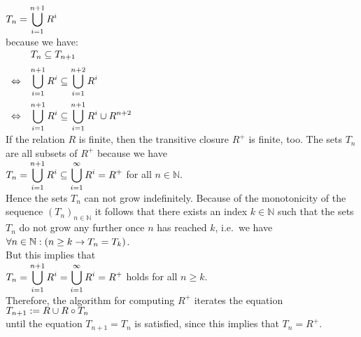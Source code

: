 \\[0.2cm]
\hspace*{1.3cm}
$\displaystyle T_n = \bigcup\limits_{i=1}^{n+1} R^i$ 
\\[0.2cm]
because we have:
\\[0.2cm]
\hspace*{1.3cm}
$
\begin{array}[t]{llcl}
                & \displaystyle T_n \subseteq T_{n+1} \\[0.2cm]
\Leftrightarrow & \displaystyle \bigcup\limits_{i=1}^{n+1} R^i \subseteq \bigcup\limits_{i=1}^{n+2} R^i \\[0.5cm]
\Leftrightarrow & \displaystyle \bigcup\limits_{i=1}^{n+1} R^i \subseteq \bigcup\limits_{i=1}^{n+1} R^i \cup R^{n+2} \\
\end{array}
$
\\[0.2cm]
If the relation  $R$ is finite, then the transitive closure $R^+$ is finite, too.  The sets $T_n$ 
are all subsets of $R^+$ because we have
\\[0.2cm]
\hspace*{1.3cm}
$\displaystyle T_n = \bigcup\limits_{i=1}^{n+1} R^i \subseteq \bigcup\limits_{i=1}^{\infty} R^i = R^+$ \quad for all $n \in \mathbb{N}$.
\\[0.2cm]
Hence the sets $T_n$ can not grow indefinitely.  Because of the monotonicity of the sequence 
$(T_n)_{n\in\mathbb{N}}$ it follows that there exists an index  $k \in \mathbb{N}$ such that the sets $T_n$ do
not grow any further once $n$ has reached $k$, i.e.~we have
\\[0.2cm]
\hspace*{1.3cm}
$\displaystyle \forall n \in \mathbb{N}:( n \geq k \rightarrow T_n = T_k)$.
\\[0.2cm]
But this implies that
\\[0.2cm]
\hspace*{1.3cm}
$\displaystyle T_n = \bigcup\limits_{i=1}^{n+1} R^i = \bigcup\limits_{i=1}^{\infty} R^i = R^+$ 
\quad holds for all $n \geq k$.
\\[0.2cm]
Therefore, the algorithm for computing  $R^+$ iterates the equation 
\\[0.2cm]
\hspace*{1.3cm}
$\displaystyle T_{n+1} := R \cup R \circ T_n$
\\[0.2cm]
until the equation  $T_{n+1} = T_n$ is satisfied, since this implies that $T_n = R^+$.


